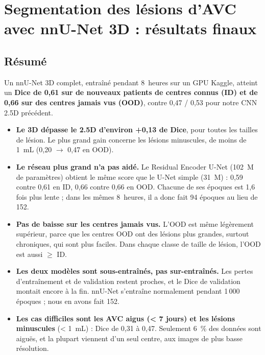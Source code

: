 
\newcommand{\figureafournir}[1]{%
  \fbox{\parbox{0.9\linewidth}{\centering\vspace{1.5em}\textbf{[FIGURE À FOURNIR PAR ANAS : #1]}\vspace{1.5em}}}}

\chapter{Segmentation des lésions d'AVC avec nnU-Net 3D : résultats finaux}
\label{chap:anas}

\section{Résumé}
\label{sec:anas-resume}

Un nnU-Net 3D complet, entraîné pendant 8~heures sur un GPU Kaggle, atteint un \textbf{Dice de 0,61 sur de nouveaux patients de centres connus (ID) et de 0,66 sur des centres jamais vus (OOD)}, contre 0,47 / 0,53 pour notre CNN 2.5D précédent.

\begin{itemize}
  \item \textbf{Le 3D dépasse le 2.5D d'environ +0,13 de Dice}, pour toutes les tailles de lésion. Le plus grand gain concerne les lésions minuscules, de moins de 1~mL (0,20 $\rightarrow$ 0,47 en OOD).
  \item \textbf{Le réseau plus grand n'a pas aidé.} Le Residual Encoder U-Net (102~M de paramètres) obtient le même score que le U-Net simple (31~M) : 0,59 contre 0,61 en ID, 0,66 contre 0,66 en OOD. Chacune de ses époques est 1,6 fois plus lente ; dans les mêmes 8~heures, il a donc fait 94 époques au lieu de 152.
  \item \textbf{Pas de baisse sur les centres jamais vus.} L'OOD est même légèrement supérieur, parce que les centres OOD ont des lésions plus grandes, surtout chroniques, qui sont plus faciles. Dans chaque classe de taille de lésion, l'OOD est aussi $\geq$ ID.
  \item \textbf{Les deux modèles sont sous-entraînés, pas sur-entraînés.} Les pertes d'entraînement et de validation restent proches, et le Dice de validation montait encore à la fin. nnU-Net s'entraîne normalement pendant 1\,000 époques ; nous en avons fait 152.
  \item \textbf{Les cas difficiles sont les AVC aigus (< 7 jours) et les lésions minuscules} (< 1~mL) : Dice de 0,31 à 0,47. Seulement 6~\% des données sont aiguës, et la plupart viennent d'un seul centre, aux images de plus basse résolution.
\end{itemize}

